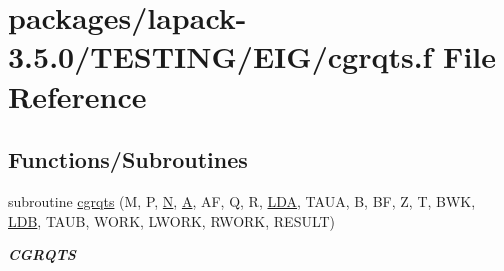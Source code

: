 \hypertarget{cgrqts_8f}{}\section{packages/lapack-\/3.5.0/\+T\+E\+S\+T\+I\+N\+G/\+E\+I\+G/cgrqts.f File Reference}
\label{cgrqts_8f}
\subsection*{Functions/\+Subroutines}
\begin{DoxyCompactItemize}
\item 
subroutine \hyperlink{group__complex__eig_gabe5f303c97976c8ca2871a3a253e2113}{cgrqts} (M, P, \hyperlink{polmisc_8c_a0240ac851181b84ac374872dc5434ee4}{N}, \hyperlink{classA}{A}, A\+F, Q, R, \hyperlink{example__user_8c_ae946da542ce0db94dced19b2ecefd1aa}{L\+D\+A}, T\+A\+U\+A, B, B\+F, Z, T, B\+W\+K, \hyperlink{example__user_8c_a50e90a7104df172b5a89a06c47fcca04}{L\+D\+B}, T\+A\+U\+B, W\+O\+R\+K, L\+W\+O\+R\+K, R\+W\+O\+R\+K, R\+E\+S\+U\+L\+T)
\begin{DoxyCompactList}\small\item\em {\bfseries C\+G\+R\+Q\+T\+S} \end{DoxyCompactList}\end{DoxyCompactItemize}
